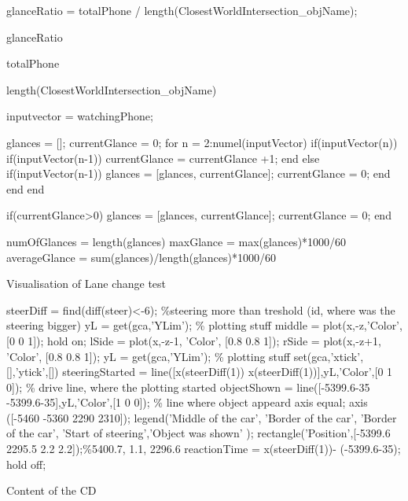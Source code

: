 glanceRatio = totalPhone / length(ClosestWorldIntersection_objName);

glanceRatio

totalPhone

length(ClosestWorldIntersection_objName)

inputvector = watchingPhone;

glances = [];
currentGlance = 0;
for n = 2:numel(inputVector)
    if(inputVector(n))
        if(inputVector(n-1))
            currentGlance = currentGlance +1;
        end
    else
        if(inputVector(n-1))
            glances = [glances, currentGlance];
            currentGlance = 0;
        end
    end
end


if(currentGlance>0)
    glances = [glances, currentGlance];
    currentGlance = 0;
end

numOfGlances = length(glances)
maxGlance = max(glances)*1000/60
averageGlance = sum(glances)/length(glances)*1000/60
\endtt

\secc Visualisation of Lane change test

\begtt
steerDiff = find(diff(steer)<-6); \%steering more than treshold (id, where was the steering bigger)
yL = get(gca,'YLim'); \% plotting stuff
middle = plot(x,-z,'Color',[0 0 1]);
hold on;
lSide = plot(x,-z-1, 'Color', [0.8 0.8 1]);
rSide = plot(x,-z+1, 'Color', [0.8 0.8 1]);
yL = get(gca,'YLim'); \% plotting stuff
set(gca,'xtick',[],'ytick',[])
steeringStarted = line([x(steerDiff(1)) x(steerDiff(1))],yL,'Color',[0 1 0]); \% drive line, where the plotting started
objectShown = line([-5399.6-35 -5399.6-35],yL,'Color',[1 0 0]); \% line where object appeard
axis equal;
axis ([-5460 -5360 2290 2310]);
legend('Middle of the car', 'Border of the car', 'Border of the car', 'Start of steering','Object was shown'  );
rectangle('Position',[-5399.6 2295.5 2.2 2.2]);\%5400.7, 1.1, 2296.6
reactionTime = x(steerDiff(1))- (-5399.6-35);
hold off;
\endtt

\nextoddpage

\app Content of the CD

